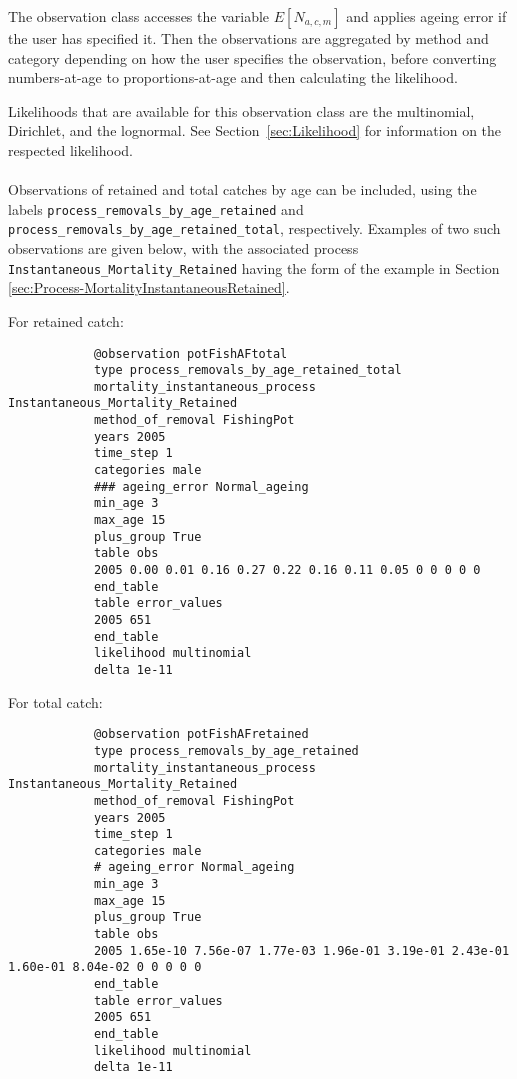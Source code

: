 \begin{itemize}
	The observation class accesses the variable $E[N_{a,c,m}]$ and applies ageing error if the user has specified it. Then the observations are aggregated by method and category depending on how the user specifies the observation, before converting numbers-at-age to proportions-at-age and then calculating the likelihood.
	
	Likelihoods that are available for this observation class are the multinomial, Dirichlet, and the lognormal. See Section~\ref{sec:Likelihood} for information on the respected likelihood.
	
	\paragraph*{} \label{sec:Observation-ProcessRemovalsByAgeRetained} \label{sec:Observation-ProcessRemovalsByAgeRetainedTotal}
	
	Observations of retained and total catches by age can be included, using the labels \texttt{process\_removals\_by\_age\_retained} and \texttt{process\_removals\_by\_age\_retained\_total}, respectively. Examples of two such observations are given below, with the associated process \texttt{Instantaneous\_Mortality\_Retained} having the form of the example in Section \ref{sec:Process-MortalityInstantaneousRetained}.
	
	For retained catch:
	
	{\small{\begin{verbatim}
			@observation potFishAFtotal
			type process_removals_by_age_retained_total
			mortality_instantaneous_process Instantaneous_Mortality_Retained
			method_of_removal FishingPot
			years 2005
			time_step 1
			categories male
			### ageing_error Normal_ageing
			min_age 3
			max_age 15
			plus_group True
			table obs
			2005 0.00 0.01 0.16 0.27 0.22 0.16 0.11 0.05 0 0 0 0 0
			end_table
			table error_values
			2005 651
			end_table
			likelihood multinomial
			delta 1e-11
			\end{verbatim}}}
	
	For total catch:
	
	{\small{\begin{verbatim}
			@observation potFishAFretained
			type process_removals_by_age_retained
			mortality_instantaneous_process Instantaneous_Mortality_Retained
			method_of_removal FishingPot
			years 2005
			time_step 1
			categories male
			# ageing_error Normal_ageing
			min_age 3
			max_age 15
			plus_group True
			table obs
			2005 1.65e-10 7.56e-07 1.77e-03 1.96e-01 3.19e-01 2.43e-01 1.60e-01 8.04e-02 0 0 0 0 0
			end_table
			table error_values
			2005 651
			end_table
			likelihood multinomial
			delta 1e-11
			\end{verbatim}}}
	

\end{itemize}
